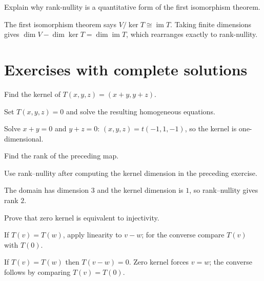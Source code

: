 \begin{problem}\label{prob:i06-problem-12}
Explain why rank-nullity is a quantitative form of the first isomorphism theorem.
\end{problem}
\begin{solution}
The first isomorphism theorem says $V/\ker T\cong\operatorname{im}T$. Taking finite dimensions gives $\dim V-\dim\ker T=\dim\operatorname{im}T$, which rearranges exactly to rank-nullity.
\end{solution}


\section{Exercises with complete solutions}

\begin{exercise}\label{exr:i06-01}
Find the kernel of $T(x,y,z)=(x+y,y+z)$.
\end{exercise}
\begin{hint}
Set \(T(x,y,z)=0\) and solve the resulting homogeneous equations.
\end{hint}
\begin{solution}
Solve $x+y=0$ and $y+z=0$: $(x,y,z)=t(-1,1,-1)$, so the kernel is one-dimensional.
\end{solution}

\begin{exercise}\label{exr:i06-02}
Find the rank of the preceding map.
\end{exercise}
\begin{hint}
Use rank--nullity after computing the kernel dimension in the preceding exercise.
\end{hint}
\begin{solution}
The domain has dimension $3$ and the kernel dimension is $1$, so rank–nullity gives rank $2$.
\end{solution}

\begin{exercise}\label{exr:i06-03}
Prove that zero kernel is equivalent to injectivity.
\end{exercise}
\begin{hint}
If \(T(v)=T(w)\), apply linearity to \(v-w\); for the converse compare \(T(v)\) with \(T(0)\).
\end{hint}
\begin{solution}
If $T(v)=T(w)$ then $T(v-w)=0$. Zero kernel forces $v=w$; the converse follows by comparing $T(v)=T(0)$.
\end{solution}

